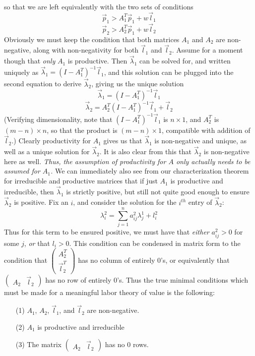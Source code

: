so that we are left equivalently with the two sets of conditions
\[  \vec{p}_1 > A_1^T\vec{p}_1 + w\vec{l}_1 \]
\[  \vec{p}_2 > A_2^T\vec{p}_1 + w\vec{l}_2 \]
Obviously we must keep the condition that both matrices $A_1$ and $A_2$ are non-negative, along with non-negativity for both $\vec{l}_1$ and $\vec{l}_2$. Assume for a moment though that \emph{only} $A_1$ is productive. Then $\vec{\lambda}_1$ can be solved for, and written uniquely as $\vec{\lambda}_1 = (I-A_1^T)^{-1}\vec{l}_1$, and this solution can be plugged into the second equation to derive $\vec{\lambda}_2$, giving us the unique solution
\[ \vec{\lambda}_1 = (I-A_1^T)^{-1}\vec{l}_1 \]
\[ \vec{\lambda}_2 = A_2^T(I-A_1^T)^{-1}\vec{l}_1 + \vec{l}_2 \]
(Verifying dimensionality, note that $(I-A_1^T)^{-1}\vec{l}_1$ is $n\times 1$, and $A_2^T$ is $(m-n) \times n$, so that the product is $(m-n)\times 1$, compatible with addition of $\vec{l}_2$.) Clearly productivity for $A_1$ gives us that $\vec{\lambda}_1$ is non-negative and unique, as well as a unique solution for $\vec{\lambda}_2$. It is also clear from this that $\vec{\lambda}_2$ is non-negative here as well. \emph{Thus, the assumption of productivity for $A$ only actually needs to be assumed for $A_1$.} We can immediately also see from our characterization theorem for irreducible and productive matrices that if just $A_1$ is productive and irreducible, then $\vec{\lambda}_1$ is strictly positive, but still not quite good enough to ensure $\vec{\lambda}_2$ is positive. Fix an $i$, and consider the solution for the $i^{th}$ entry of $\vec{\lambda}_2$:
\[ \lambda^2_i = \sum_{j=1}^n a^2_{ij}\lambda^1_j + l^2_i \]
Thus for this term to be ensured positive, we must have that \emph{either} $a^2_{ij} > 0$ for some $j$, \emph{or} that $l_i > 0$. This condition can be condensed in matrix form to the condition that $\begin{pmatrix} A^T_2 \\ \vec{l}_2^T \end{pmatrix}$ has no column of entirely $0$'s, or equivalently that $\begin{pmatrix} A_2 & \vec{l}_2 \end{pmatrix}$ has no row of entirely $0$'s. Thus the true minimal conditions which must be made for a meaningful labor theory of value is the following:
\begin{itemize}
	\item[(1)] $A_1$, $A_2$, $\vec{l}_1$, and $\vec{l}_2$ are non-negative.
	\item[(2)] $A_1$ is productive and irreducible
	\item[(3)] The matrix $\begin{pmatrix} A_2 & \vec{l}_2 \end{pmatrix}$ has no $0$ rows.
\end{itemize} 
